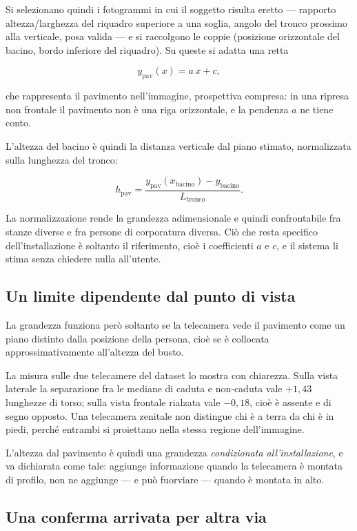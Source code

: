Si selezionano quindi i fotogrammi in cui il soggetto risulta eretto — rapporto
altezza/larghezza del riquadro superiore a una soglia, angolo del tronco
prossimo alla verticale, posa valida — e si raccolgono le coppie (posizione
orizzontale del bacino, bordo inferiore del riquadro). Su queste si adatta una
retta

\[
y_{\text{pav}}(x) = a\,x + c,
\]

che rappresenta il pavimento nell'immagine, prospettiva compresa: in una ripresa
non frontale il pavimento non è una riga orizzontale, e la pendenza $a$ ne tiene
conto.

L'altezza del bacino è quindi la distanza verticale dal piano stimato,
normalizzata sulla lunghezza del tronco:

\[
h_{\text{pav}} = \frac{y_{\text{pav}}(x_{\text{bacino}}) - y_{\text{bacino}}}
                      {L_{\text{tronco}}} .
\]

La normalizzazione rende la grandezza adimensionale e quindi confrontabile fra
stanze diverse e fra persone di corporatura diversa. Ciò che resta specifico
dell'installazione è soltanto il riferimento, cioè i coefficienti $a$ e $c$, e
il sistema li stima senza chiedere nulla all'utente.

\subsection{Un limite dipendente dal punto di vista}

La grandezza funziona però soltanto se la telecamera vede il pavimento come un
piano distinto dalla posizione della persona, cioè se è collocata
approssimativamente all'altezza del busto.

La misura sulle due telecamere del dataset lo mostra con chiarezza. Sulla vista
laterale la separazione fra le mediane di caduta e non-caduta vale
$+1{,}43$ lunghezze di torso; sulla vista frontale rialzata vale $-0{,}18$, cioè
è assente e di segno opposto. Una telecamera zenitale non distingue chi è a
terra da chi è in piedi, perché entrambi si proiettano nella stessa regione
dell'immagine.

L'altezza dal pavimento è quindi una grandezza \emph{condizionata
all'installazione}, e va dichiarata come tale: aggiunge informazione quando la
telecamera è montata di profilo, non ne aggiunge — e può fuorviare — quando è
montata in alto.

\subsection{Una conferma arrivata per altra via}

